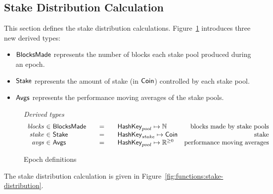 \subsection{Stake Distribution Calculation}
\label{sec:stake-dist-calc}

This section defines the stake distribution calculations.
Figure~\ref{fig:epoch-defs} introduces three new derived types:
\begin{itemize}
  \item $\mathsf{BlocksMade}$ represents the number of blocks each stake pool produced
    during an epoch.
  \item $\mathsf{Stake}$ represents the amount of stake (in $\mathsf{Coin}$) controlled by each
    stake pool.
  \item $\mathsf{Avgs}$ represents the performance moving averages of the stake pools.
\end{itemize}

\begin{figure}[htb]
  \emph{Derived types}
  \begin{equation*}
    \begin{array}{r@{~\in~}l@{\qquad=\qquad}lr}
      \var{blocks}
      & \BlocksMade
      & \HashKey_{pool} \mapsto \N
      & \text{blocks made by stake pools} \\
      \var{stake}
      & \Stake
      & \HashKey_{stake} \mapsto \Coin
      & \text{stake} \\
      \var{avgs}
      & \Avgs
      & \HashKey_{pool} \mapsto \Rnn
      & \text{performance moving averages} \\
    \end{array}
  \end{equation*}
  \caption{Epoch definitions}
  \label{fig:epoch-defs}
\end{figure}

The stake distribution calculation is given in Figure~\ref{fig:functions:stake-distribution}.

